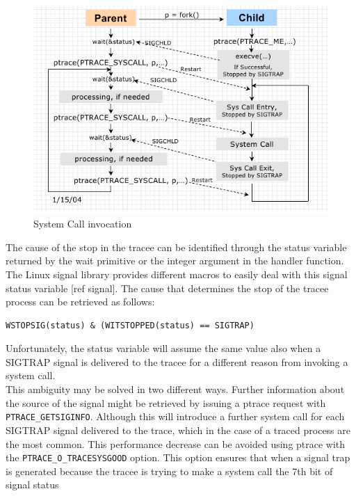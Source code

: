 \begin{figure}[h]
\centering
\includegraphics[scale=0.6]{Chapter1/Chapter1Figs/ptrace_systemcall.png} 
\caption{System Call invocation}
\label{fig:ptrace_systemCall}
\end{figure}


The cause of the stop in the tracee can be identified through the status variable returned by the wait primitive or the integer argument in the handler function.  The Linux signal library  provides different macros to easily deal with this signal status variable [ref signal]. The cause that determines the stop of the tracee process can be retrieved as follows:
\begin{center}
\begin{lstlisting}[caption={Condition that identifies SIGTRAP signals}]
									WSTOPSIG(status) & (WITSTOPPED(status) == SIGTRAP)
\end{lstlisting}
\end{center}

Unfortunately, the status variable will assume the same value also when a SIGTRAP signal is delivered to the tracee for a different reason from invoking a system call. \\
This ambiguity may be solved in two different ways. Further information about the source of the signal might be retrieved by issuing a ptrace request with \lstinline$PTRACE_GETSIGINFO$.  Although this will introduce a further system call for each SIGTRAP signal delivered to the trace, which in the case of a traced process are the most common.  This performance decrease can be avoided using ptrace with the \lstinline$PTRACE_O_TRACESYSGOOD$ option. This option ensures that when a signal trap is generated because the tracee is trying to make a system call the 7th bit of signal status

